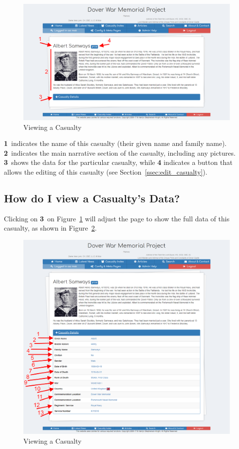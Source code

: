 \documentclass[12pt]{article}
\newcommand{\marker}[1]{\color{red}\textbf{#1}\color{black}}
\begin{document}
\begin{figure}[h]
  \centering
 \includegraphics[width=.9\textwidth]{pics/view_casualty.png}
	\caption{Viewing a Casualty}\label{fig:view_casualty}
\end{figure}

\marker{1}\ indicates the name of this casualty (their given name and family name). \marker{2}\ indicates the main narrative section of the casualty, including any pictures. \marker{3}\ shows the data for the particular casualty, while \marker{4} indicates a button that allows the editing of this casualty (see Section~\ref{ssec:edit_casualty}).

\newpage
\FloatBarrier
\subsection{How do I view a Casualty's Data?}\label{ssec:view_casualty_data}
Clicking on \marker{3}\ on Figure~\ref{fig:view_casualty} will adjust the page to show the full data of this casualty, as shown in Figure~\ref{fig:view_casualty_data}.

\begin{figure}[h]
  \centering
 \includegraphics[width=.9\textwidth]{pics/view_casualty_data.png}
	\caption{Viewing a Casualty}\label{fig:view_casualty_data}
\end{figure}
\end{document}
